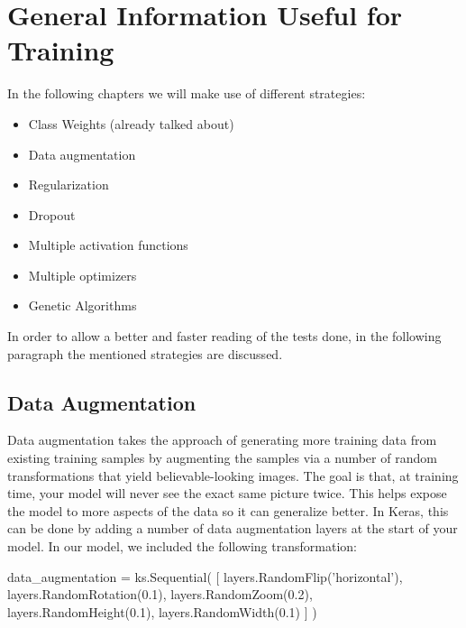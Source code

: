 \section{General Information Useful for Training}
In the following chapters we will make use of different strategies:
\begin{itemize}
\item Class Weights (already talked about)
\item Data augmentation
\item Regularization
\item Dropout
\item Multiple activation functions
\item Multiple optimizers
\item Genetic Algorithms
\end{itemize}
In order to allow a better and faster reading of the tests done, in the following paragraph the mentioned strategies are discussed.

\subsection{Data Augmentation}
Data augmentation takes the approach of generating more training data from existing training samples by augmenting the samples via a number of random transformations that yield believable-looking images. The goal is that, at training time, your model will never see the exact same picture twice. This helps expose the model to more aspects of the data so it can generalize better.
In Keras, this can be done by adding a number of data augmentation layers at the start of your model. In our model, we included the following transformation:

\begin{python}
data_augmentation = ks.Sequential(
    [
        layers.RandomFlip('horizontal'),
        layers.RandomRotation(0.1),
        layers.RandomZoom(0.2),
        layers.RandomHeight(0.1),
        layers.RandomWidth(0.1)
    ]
)
\end{python}

